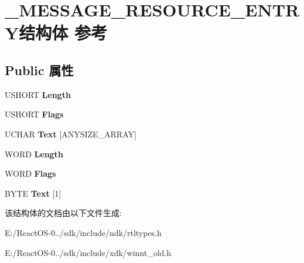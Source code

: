 \hypertarget{struct___m_e_s_s_a_g_e___r_e_s_o_u_r_c_e___e_n_t_r_y}{}\section{\+\_\+\+M\+E\+S\+S\+A\+G\+E\+\_\+\+R\+E\+S\+O\+U\+R\+C\+E\+\_\+\+E\+N\+T\+R\+Y结构体 参考}
\label{struct___m_e_s_s_a_g_e___r_e_s_o_u_r_c_e___e_n_t_r_y}
\subsection*{Public 属性}
\begin{DoxyCompactItemize}
\item 
\mbox{\label{struct___m_e_s_s_a_g_e___r_e_s_o_u_r_c_e___e_n_t_r_y_aca34c745234f42b299662865605eb98f}} 
U\+S\+H\+O\+RT {\bfseries Length}
\item 
\mbox{\label{struct___m_e_s_s_a_g_e___r_e_s_o_u_r_c_e___e_n_t_r_y_abb254433433525c5db7d822142084ec4}} 
U\+S\+H\+O\+RT {\bfseries Flags}
\item 
\mbox{\label{struct___m_e_s_s_a_g_e___r_e_s_o_u_r_c_e___e_n_t_r_y_aa25ff2f9e3fa7582b5c655d9770fdd07}} 
U\+C\+H\+AR {\bfseries Text} \mbox{[}A\+N\+Y\+S\+I\+Z\+E\+\_\+\+A\+R\+R\+AY\mbox{]}
\item 
\mbox{\label{struct___m_e_s_s_a_g_e___r_e_s_o_u_r_c_e___e_n_t_r_y_a83b1a072067c9f135214346a6d280410}} 
W\+O\+RD {\bfseries Length}
\item 
\mbox{\label{struct___m_e_s_s_a_g_e___r_e_s_o_u_r_c_e___e_n_t_r_y_a35636c906d28ea22720a9b1205b93e5d}} 
W\+O\+RD {\bfseries Flags}
\item 
\mbox{\label{struct___m_e_s_s_a_g_e___r_e_s_o_u_r_c_e___e_n_t_r_y_a1eddced63528635c7438575c90640abe}} 
B\+Y\+TE {\bfseries Text} \mbox{[}1\mbox{]}
\end{DoxyCompactItemize}


该结构体的文档由以下文件生成\+:\begin{DoxyCompactItemize}
\item 
E\+:/\+React\+O\+S-\/0../sdk/include/ndk/rtltypes.\+h\item 
E\+:/\+React\+O\+S-\/0../sdk/include/xdk/winnt\+\_\+old.\+h\end{DoxyCompactItemize}
